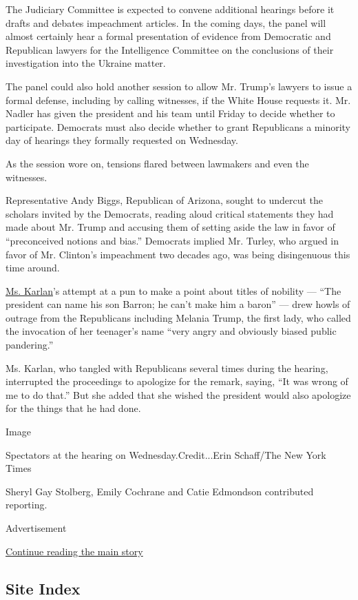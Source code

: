The Judiciary Committee is expected to convene additional hearings
before it drafts and debates impeachment articles. In the coming days,
the panel will almost certainly hear a formal presentation of evidence
from Democratic and Republican lawyers for the Intelligence Committee on
the conclusions of their investigation into the Ukraine matter.

The panel could also hold another session to allow Mr. Trump's lawyers
to issue a formal defense, including by calling witnesses, if the White
House requests it. Mr. Nadler has given the president and his team until
Friday to decide whether to participate. Democrats must also decide
whether to grant Republicans a minority day of hearings they formally
requested on Wednesday.

As the session wore on, tensions flared between lawmakers and even the
witnesses.

Representative Andy Biggs, Republican of Arizona, sought to undercut the
scholars invited by the Democrats, reading aloud critical statements
they had made about Mr. Trump and accusing them of setting aside the law
in favor of ``preconceived notions and bias.'' Democrats implied Mr.
Turley, who argued in favor of Mr. Clinton's impeachment two decades
ago, was being disingenuous this time around.

\href{https://www.nytimes3xbfgragh.onion/2019/12/04/us/politics/pamela-karlan.html}{Ms.
Karlan}'s attempt at a pun to make a point about titles of nobility ---
``The president can name his son Barron; he can't make him a baron'' ---
drew howls of outrage from the Republicans including Melania Trump, the
first lady, who called the invocation of her teenager's name ``very
angry and obviously biased public pandering.''

Ms. Karlan, who tangled with Republicans several times during the
hearing, interrupted the proceedings to apologize for the remark,
saying, ``It was wrong of me to do that.'' But she added that she wished
the president would also apologize for the things that he had done.

Image

Spectators at the hearing on Wednesday.Credit...Erin Schaff/The New York
Times

Sheryl Gay Stolberg, Emily Cochrane and Catie Edmondson contributed
reporting.

Advertisement

\protect\hyperlink{after-bottom}{Continue reading the main story}

\hypertarget{site-index}{%
\subsection{Site Index}\label{site-index}}

